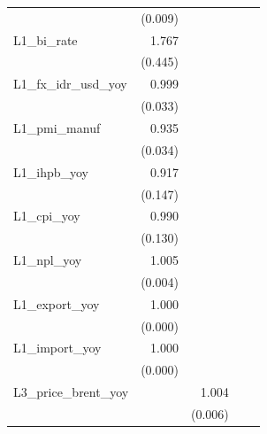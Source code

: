 {\begin{tabular}{l*{4}{D{.}{.}{-1}}}
                &  (0.009)         &                  &                  &                  \\
\addlinespace
L1\_bi\_rate      &    1.767\sym{**} &                  &                  &                  \\
                &  (0.445)         &                  &                  &                  \\
\addlinespace
L1\_fx\_idr\_usd\_yoy&    0.999         &                  &                  &                  \\
                &  (0.033)         &                  &                  &                  \\
\addlinespace
L1\_pmi\_manuf    &    0.935\sym{*}  &                  &                  &                  \\
                &  (0.034)         &                  &                  &                  \\
\addlinespace
L1\_ihpb\_yoy     &    0.917         &                  &                  &                  \\
                &  (0.147)         &                  &                  &                  \\
\addlinespace
L1\_cpi\_yoy      &    0.990         &                  &                  &                  \\
                &  (0.130)         &                  &                  &                  \\
\addlinespace
L1\_npl\_yoy      &    1.005         &                  &                  &                  \\
                &  (0.004)         &                  &                  &                  \\
\addlinespace
L1\_export\_yoy   &    1.000         &                  &                  &                  \\
                &  (0.000)         &                  &                  &                  \\
\addlinespace
L1\_import\_yoy   &    1.000         &                  &                  &                  \\
                &  (0.000)         &                  &                  &                  \\
\addlinespace
L3\_price\_brent\_yoy&                  &    1.004         &                  &                  \\
                &                  &  (0.006)         &                  &                  \\

\end{tabular}}
